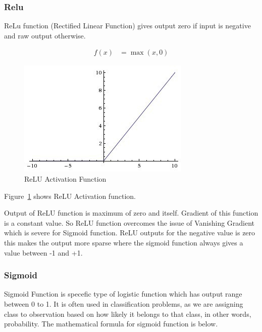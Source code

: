 \subsubsection{Relu}

ReLu function (Rectified Linear Function) gives output zero if input is
negative and raw output otherwise.

\begin{align*}
f(x)&= \max(x,0)
\end{align*}

\begin{figure}[!ht]
        \centering\includegraphics[width=\columnwidth]
        {images/relu-activation-function.jpeg}
        \caption{ReLU Activation Function~\cite{hid-sp18-401-ReLU-activation-function}}
        \label{f:ReLU-function}
\end{figure}

Figure~\ref{f:ReLU-function} shows ReLU Activation function.

Output of ReLU function is maximum of zero and itself. Gradient of this function
is a constant value. So ReLU function overcomes the issue of Vanishing Gradient
which is severe for Sigmoid function. ReLU outputs for the negative value is
zero this makes the output more sparse where the sigmoid function always gives a
value between -1 and +1.


\subsubsection{Sigmoid}

Sigmoid Function is specefic type of logistic function which has output range
between 0 to 1. It is often used in classification problems, as we are
assigning class to observation based on how likely it belongs to that class,
in other words, probability. The mathematical formula for sigmoid function is
below.

